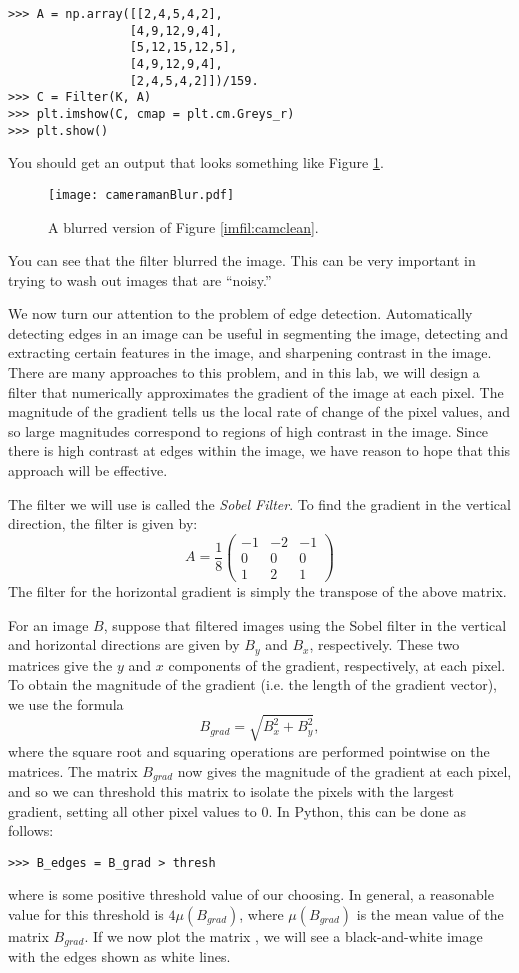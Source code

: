 \begin{lstlisting}
>>> A = np.array([[2,4,5,4,2],
                 [4,9,12,9,4],
                 [5,12,15,12,5],
                 [4,9,12,9,4],
                 [2,4,5,4,2]])/159.
>>> C = Filter(K, A)
>>> plt.imshow(C, cmap = plt.cm.Greys_r)
>>> plt.show()
\end{lstlisting}
You should get an output that looks something like Figure \ref{imfil:camblur}.
\begin{figure}
\texttt{[image: cameramanBlur.pdf]}
\caption{A blurred version of Figure \ref{imfil:camclean}.}
\label{imfil:camblur}
\end{figure}
You can see that the filter blurred the image. This can be very important in trying to 
wash out images that are ``noisy.''

We now turn our attention to the problem of edge detection. Automatically detecting edges in an image
can be useful in segmenting the image, detecting and extracting certain features in the image, and
sharpening contrast in the image. There are many approaches to this problem, and in this lab, we will
design a filter that numerically approximates the gradient of the image at each pixel. The magnitude
of the gradient tells us the local rate of change of the pixel values, and so large magnitudes 
correspond to regions of high contrast in the image. Since there is high contrast at edges within
the image, we have reason to hope that this approach will be effective.

The filter we will use is called the \emph{Sobel Filter}. To find the gradient 
in the vertical direction, the filter is given by:
\[
A = \frac{1}{8}\begin{pmatrix}
-1&-2&-1\\
0&0&0\\
1&2&1
\end{pmatrix}
\]
The filter for the horizontal gradient is simply the transpose of the above matrix.

For an image $B$, suppose that filtered images using the Sobel filter in the vertical and
horizontal directions are given by $B_y$ and $B_x$, respectively. These two matrices give
the $y$ and $x$ components of the gradient, respectively, at each pixel. To obtain the 
magnitude of the gradient (i.e. the length of the gradient vector), we use the formula
$$
B_{grad} = \sqrt{B_x^2 + B_y^2},
$$
where the square root and squaring operations are performed pointwise on the matrices. 
The matrix $B_{grad}$ now gives the magnitude of the gradient at each pixel, and so we
can threshold this matrix to isolate the pixels with the largest gradient, setting all 
other pixel values to 0. 
In Python, this can be done as follows:
\begin{lstlisting}
>>> B_edges = B_grad > thresh
\end{lstlisting}
where  is some positive threshold value of our choosing. In general, a reasonable
value for this threshold is $4\mu(B_{grad})$, where $\mu(B_{grad})$ is the mean value of the 
matrix $B_{grad}$.
If we now plot the matrix , we will see a black-and-white image with the edges 
shown as white lines.

